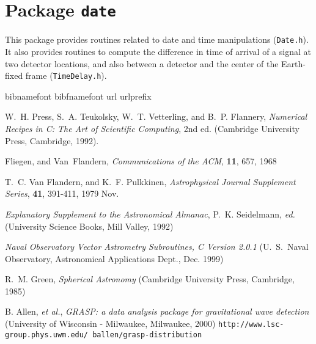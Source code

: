 
\chapter{Package \texttt{date}}

This package provides routines related to date and time manipulations
(\texttt{Date.h}).  It also provides routines to compute the
difference in time of arrival of a signal at two detector locations,
and also between a detector and the center of the Earth-fixed frame
(\texttt{TimeDelay.h}).

\newpage

\newpage

\newpage\begin{thebibliography}{1}
\expandafter\ifx\csname bibnamefont\endcsname\relax
  \def\bibnamefont#1{#1}\fi
\expandafter\ifx\csname bibfnamefont\endcsname\relax
  \def\bibfnamefont#1{#1}\fi
\expandafter\ifx\csname url\endcsname\relax
  \def\url#1{\texttt{#1}}\fi
\expandafter\ifx\csname urlprefix\endcsname\relax\def\urlprefix{URL }\fi
\providecommand{\bibinfo}[2]{#2}
\providecommand{\eprint}[2][]{\url{#2}}

  W.~H. Press, S.~A. Teukolsky, W.~T. Vetterling, and B.~P. Flannery,
  \textit{Numerical Recipes in C: The Art of Scientific Computing}, 2nd ed.
  (Cambridge University Press, Cambridge, 1992).
  
  Fliegen, and Van~Flandern, \textit{Communications of the ACM}, \textbf{11},
  657, 1968 

  T.~C. Van Flandern, and K.~F. Pulkkinen, 
  \textit{Astrophysical Journal Supplement Series}, \textbf{41},
  391-411, 1979 Nov.
  
 \textit{Explanatory Supplement to the Astronomical
  Almanac}, P.~K. Seidelmann, \textit{ed.} (University Science Books,
  Mill Valley, 1992)

  \textit{Naval Observatory Vector Astrometry Subroutines, C Version 2.0.1}
  (U.~S.~Naval Observatory, Astronomical Applications Dept., Dec. 1999)
  
  R.~M. Green, \textit{Spherical Astronomy} (Cambridge University Press,
  Cambridge, 1985)
  
  B. Allen, \textit{et al.}, \textit{GRASP: a data analysis package
    for gravitational wave detection} (University of Wisconsin
  - Milwaukee, Milwaukee, 2000) 
  \url{http://www.lsc-group.phys.uwm.edu/~ballen/grasp-distribution}
  

\end{thebibliography}
